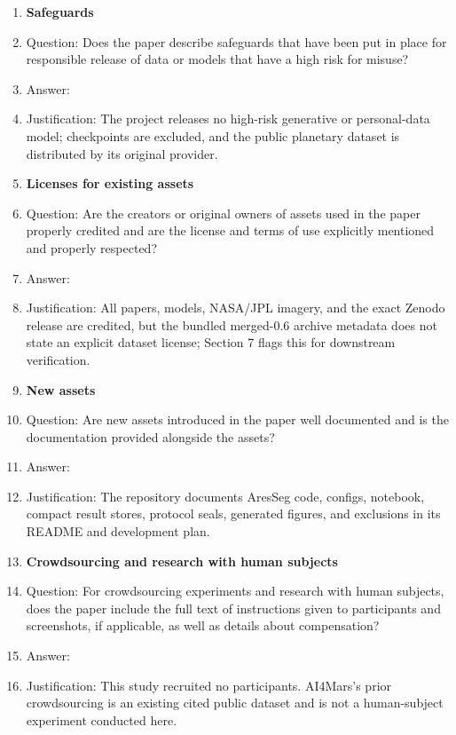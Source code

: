 \begin{enumerate}
\item \textbf{Safeguards}
  \item[] Question: Does the paper describe safeguards that have been put in place for responsible release of data or models that have a high risk for misuse?
  \item[] Answer: \answerNA{}
  \item[] Justification: The project releases no high-risk generative or personal-data model; checkpoints are excluded, and the public planetary dataset is distributed by its original provider.

\item \textbf{Licenses for existing assets}
  \item[] Question: Are the creators or original owners of assets used in the paper properly credited and are the license and terms of use explicitly mentioned and properly respected?
  \item[] Answer: \answerNo{}
  \item[] Justification: All papers, models, NASA/JPL imagery, and the exact Zenodo release are credited, but the bundled merged-0.6 archive metadata does not state an explicit dataset license; Section 7 flags this for downstream verification.

\item \textbf{New assets}
  \item[] Question: Are new assets introduced in the paper well documented and is the documentation provided alongside the assets?
  \item[] Answer: \answerYes{}
  \item[] Justification: The repository documents AresSeg code, configs, notebook, compact result stores, protocol seals, generated figures, and exclusions in its README and development plan.

\item \textbf{Crowdsourcing and research with human subjects}
  \item[] Question: For crowdsourcing experiments and research with human subjects, does the paper include the full text of instructions given to participants and screenshots, if applicable, as well as details about compensation?
  \item[] Answer: \answerNA{}
  \item[] Justification: This study recruited no participants. AI4Mars's prior crowdsourcing is an existing cited public dataset and is not a human-subject experiment conducted here.


\end{enumerate}

